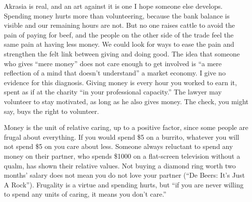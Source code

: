 Akrasia is real, and an art against it is one I hope someone else develops. Spending money hurts more than volunteering, because the bank balance is visible and our remaining hours are not. But no one raises cattle to avoid the pain of paying for beef, and the people on the other side of the trade feel the same pain at having less money. We could look for ways to ease the pain and strengthen the felt link between giving and doing good. The idea that someone who gives ``mere money'' does not care enough to get involved is ``a mere reflection of a mind that doesn't understand'' a market economy. I give no evidence for this diagnosis. Giving money is every hour you worked to earn it, spent as if at the charity ``in your professional capacity.'' The lawyer may volunteer to stay motivated, as long as he also gives money. The check, you might say, buys the right to volunteer.

Money is the unit of relative caring, up to a positive factor, since some people are frugal about everything. If you would spend \$5 on a burrito, whatever you will not spend \$5 on you care about less. Someone always reluctant to spend any money on their partner, who spends \$1000 on a flat-screen television without a qualm, has shown their relative values. Not buying a diamond ring worth two months' salary does not mean you do not love your partner (``De Beers: It's Just A Rock'').  Frugality is a virtue and spending hurts, but ``if you are never willing to spend any units of caring, it means you don't care.''
